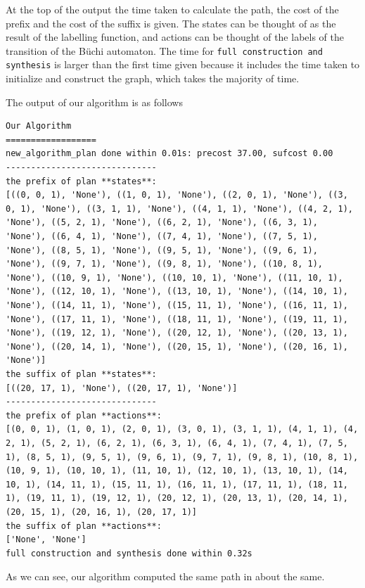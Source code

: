At the top of the output the time taken to calculate the path, the cost of the prefix and the cost of the suffix is given. The states can be thought of as the result of the labelling function, and actions can be thought of the labels of the transition of the B\"uchi automaton. The time for \texttt{full construction and synthesis} is larger than the first time given because it includes the time taken to initialize and construct the graph, which takes the majority of time.

The output of our algorithm is as follows

\begin{lstlisting}
Our Algorithm
==================
new_algorithm_plan done within 0.01s: precost 37.00, sufcost 0.00
------------------------------
the prefix of plan **states**:
[((0, 0, 1), 'None'), ((1, 0, 1), 'None'), ((2, 0, 1), 'None'), ((3, 0, 1), 'None'), ((3, 1, 1), 'None'), ((4, 1, 1), 'None'), ((4, 2, 1), 'None'), ((5, 2, 1), 'None'), ((6, 2, 1), 'None'), ((6, 3, 1), 'None'), ((6, 4, 1), 'None'), ((7, 4, 1), 'None'), ((7, 5, 1), 'None'), ((8, 5, 1), 'None'), ((9, 5, 1), 'None'), ((9, 6, 1), 'None'), ((9, 7, 1), 'None'), ((9, 8, 1), 'None'), ((10, 8, 1), 'None'), ((10, 9, 1), 'None'), ((10, 10, 1), 'None'), ((11, 10, 1), 'None'), ((12, 10, 1), 'None'), ((13, 10, 1), 'None'), ((14, 10, 1), 'None'), ((14, 11, 1), 'None'), ((15, 11, 1), 'None'), ((16, 11, 1), 'None'), ((17, 11, 1), 'None'), ((18, 11, 1), 'None'), ((19, 11, 1), 'None'), ((19, 12, 1), 'None'), ((20, 12, 1), 'None'), ((20, 13, 1), 'None'), ((20, 14, 1), 'None'), ((20, 15, 1), 'None'), ((20, 16, 1), 'None')]
the suffix of plan **states**:
[((20, 17, 1), 'None'), ((20, 17, 1), 'None')]
------------------------------
the prefix of plan **actions**:
[(0, 0, 1), (1, 0, 1), (2, 0, 1), (3, 0, 1), (3, 1, 1), (4, 1, 1), (4, 2, 1), (5, 2, 1), (6, 2, 1), (6, 3, 1), (6, 4, 1), (7, 4, 1), (7, 5, 1), (8, 5, 1), (9, 5, 1), (9, 6, 1), (9, 7, 1), (9, 8, 1), (10, 8, 1), (10, 9, 1), (10, 10, 1), (11, 10, 1), (12, 10, 1), (13, 10, 1), (14, 10, 1), (14, 11, 1), (15, 11, 1), (16, 11, 1), (17, 11, 1), (18, 11, 1), (19, 11, 1), (19, 12, 1), (20, 12, 1), (20, 13, 1), (20, 14, 1), (20, 15, 1), (20, 16, 1), (20, 17, 1)]
the suffix of plan **actions**:
['None', 'None']
full construction and synthesis done within 0.32s 
\end{lstlisting}


As we can see, our algorithm computed the same path in about the same.%
